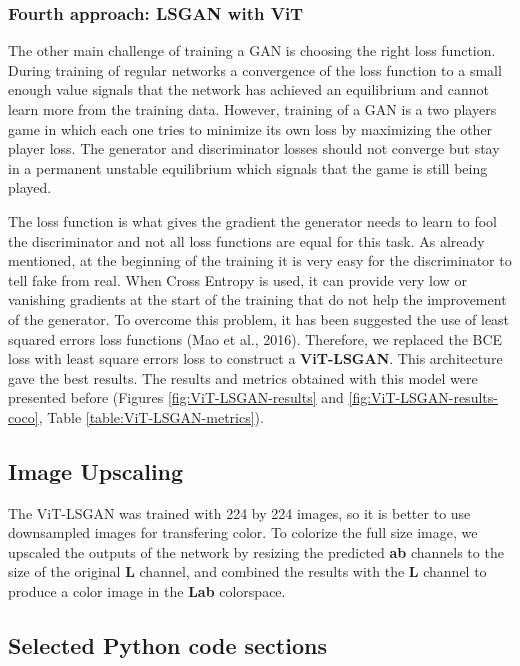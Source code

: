 \documentclass[
]{article}
\begin{document}
\hypertarget{fourth-approach-lsgan-with-vit}{%
\subsubsection{Fourth approach: LSGAN with
ViT}\label{fourth-approach-lsgan-with-vit}}

The other main challenge of training a GAN is choosing the right loss
function. During training of regular networks a convergence of the loss
function to a small enough value signals that the network has achieved
an equilibrium and cannot learn more from the training data. However,
training of a GAN is a two players game in which each one tries to
minimize its own loss by maximizing the other player loss. The generator
and discriminator losses should not converge but stay in a permanent
unstable equilibrium which signals that the game is still being played.

The loss function is what gives the gradient the generator needs to
learn to fool the discriminator and not all loss functions are equal for
this task. As already mentioned, at the beginning of the training it is
very easy for the discriminator to tell fake from real. When Cross
Entropy is used, it can provide very low or vanishing gradients at the
start of the training that do not help the improvement of the generator.
To overcome this problem, it has been suggested the use of least squared
errors loss functions (Mao et al., 2016). Therefore, we replaced the BCE
loss with least square errors loss to construct a \textbf{ViT-LSGAN}.
This architecture gave the best results. The results and metrics
obtained with this model were presented before (Figures \ref{fig:ViT-LSGAN-results} and \ref{fig:ViT-LSGAN-results-coco}, Table \ref{table:ViT-LSGAN-metrics}).

\hypertarget{image-upscaling}{%
\subsection{Image Upscaling}\label{image-upscaling}}

The ViT-LSGAN was trained with 224 by 224 images, so it is better to use
downsampled images for transfering color. To colorize the full size
image, we upscaled the outputs of the network by resizing the predicted
\textbf{ab} channels to the size of the original \textbf{L} channel, and
combined the results with the \textbf{L} channel to produce a color
image in the \textbf{Lab} colorspace.

\clearpage
\hypertarget{selected-python-code-sections}{%
\subsection{Selected Python code
sections}\label{selected-python-code-sections}}
\end{document}
